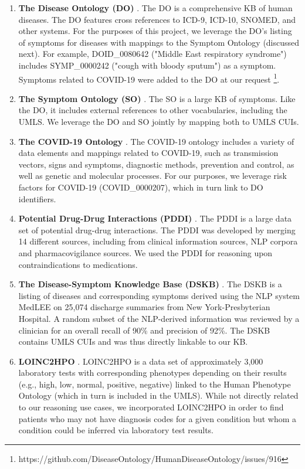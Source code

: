 \documentclass[../main.tex]{subfiles}
\begin{document}
\begin{enumerate}
    \item \textbf{The Disease Ontology (DO)} \cite{schriml2012disease}. The DO is a comprehensive KB of human diseases. The DO features cross references to ICD-9, ICD-10, SNOMED, and other systems. For the purposes of this project, we leverage the DO's listing of symptoms for diseases with mappings to the Symptom Ontology (discussed next). For example, DOID\_0080642 ("Middle East respiratory syndrome") includes SYMP\_0000242 ("cough with bloody sputum") as a symptom. Symptoms related to COVID-19 were added to the DO at our request \footnote{https://github.com/DiseaseOntology/HumanDiseaseOntology/issues/916}.
    \item \textbf{The Symptom Ontology (SO)} \cite{sayers2010database}. The SO is a large KB of symptoms. Like the DO, it includes external references to other vocabularies, including the UMLS. We leverage the DO and SO jointly by mapping both to UMLS CUIs.
    \item \textbf{The COVID-19 Ontology} \cite{sargsyan2020covid}. The COVID-19 ontology includes a variety of data elements and mappings related to COVID-19, such as transmission vectors, signs and symptoms, diagnostic methods, prevention and control, as well as genetic and molecular processes. For our purposes, we leverage risk factors for COVID-19 (COVID\_0000207), which in turn link to DO identifiers.
    \item \textbf{Potential Drug-Drug Interactions (PDDI)} \cite{ayvaz2015toward}. The PDDI is a large data set of potential drug-drug interactions. The PDDI was developed by merging 14 different sources, including from clinical information sources, NLP corpora and pharmacovigilance sources. We used the PDDI for reasoning upon contraindications to medications.
    \item \textbf{The Disease-Symptom Knowledge Base (DSKB)} \cite{wang2008automated}. The DSKB is a listing of diseases and corresponding symptoms derived using the NLP system MedLEE \cite{friedman1994general} on 25,074 discharge summaries from New York-Presbyterian Hospital. A random subset of the NLP-derived information was reviewed by a clinician for an overall recall of 90\% and precision of 92\%. The DSKB contains UMLS CUIs and was thus directly linkable to our KB. 
    \item \textbf{LOINC2HPO} \cite{zhang2019semantic}. LOINC2HPO is a data set of approximately 3,000 laboratory tests with corresponding phenotypes depending on their results (e.g., high, low, normal, positive, negative) linked to the Human Phenotype Ontology (which in turn is included in the UMLS). While not directly related to our reasoning use cases, we incorporated LOINC2HPO in order to find patients who may not have diagnosis codes for a given condition but whom a condition could be inferred via laboratory test results.
\end{enumerate}
\end{document}

